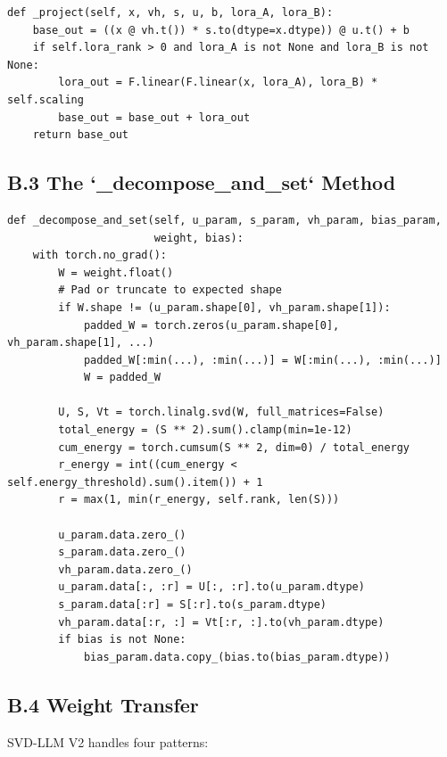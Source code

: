 \begin{lstlisting}
def _project(self, x, vh, s, u, b, lora_A, lora_B):
    base_out = ((x @ vh.t()) * s.to(dtype=x.dtype)) @ u.t() + b
    if self.lora_rank > 0 and lora_A is not None and lora_B is not None:
        lora_out = F.linear(F.linear(x, lora_A), lora_B) * self.scaling
        base_out = base_out + lora_out
    return base_out
\end{lstlisting}

\subsection{B.3 The `\_decompose\_and\_set` Method}

\begin{lstlisting}
def _decompose_and_set(self, u_param, s_param, vh_param, bias_param,
                       weight, bias):
    with torch.no_grad():
        W = weight.float()
        # Pad or truncate to expected shape
        if W.shape != (u_param.shape[0], vh_param.shape[1]):
            padded_W = torch.zeros(u_param.shape[0], vh_param.shape[1], ...)
            padded_W[:min(...), :min(...)] = W[:min(...), :min(...)]
            W = padded_W
        
        U, S, Vt = torch.linalg.svd(W, full_matrices=False)
        total_energy = (S ** 2).sum().clamp(min=1e-12)
        cum_energy = torch.cumsum(S ** 2, dim=0) / total_energy
        r_energy = int((cum_energy < self.energy_threshold).sum().item()) + 1
        r = max(1, min(r_energy, self.rank, len(S)))
        
        u_param.data.zero_()
        s_param.data.zero_()
        vh_param.data.zero_()
        u_param.data[:, :r] = U[:, :r].to(u_param.dtype)
        s_param.data[:r] = S[:r].to(s_param.dtype)
        vh_param.data[:r, :] = Vt[:r, :].to(vh_param.dtype)
        if bias is not None:
            bias_param.data.copy_(bias.to(bias_param.dtype))
\end{lstlisting}

\subsection{B.4 Weight Transfer}

SVD-LLM V2 handles four patterns:

